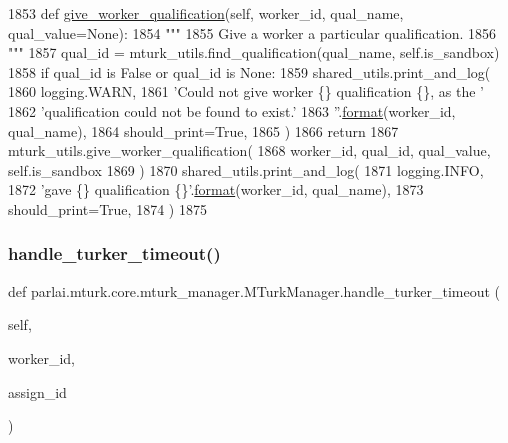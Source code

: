 \begin{DoxyCode}
1853     \textcolor{keyword}{def }\hyperlink{namespaceparlai_1_1mturk_1_1core_1_1dev_1_1mturk__utils_a631fbce36ff4d09422f29513460bc744}{give\_worker\_qualification}(self, worker\_id, qual\_name, qual\_value=None):
1854         \textcolor{stringliteral}{"""}
1855 \textcolor{stringliteral}{        Give a worker a particular qualification.}
1856 \textcolor{stringliteral}{        """}
1857         qual\_id = mturk\_utils.find\_qualification(qual\_name, self.is\_sandbox)
1858         \textcolor{keywordflow}{if} qual\_id \textcolor{keywordflow}{is} \textcolor{keyword}{False} \textcolor{keywordflow}{or} qual\_id \textcolor{keywordflow}{is} \textcolor{keywordtype}{None}:
1859             shared\_utils.print\_and\_log(
1860                 logging.WARN,
1861                 \textcolor{stringliteral}{'Could not give worker \{\} qualification \{\}, as the '}
1862                 \textcolor{stringliteral}{'qualification could not be found to exist.'}
1863                 \textcolor{stringliteral}{''}.\hyperlink{namespaceparlai_1_1chat__service_1_1services_1_1messenger_1_1shared__utils_a32e2e2022b824fbaf80c747160b52a76}{format}(worker\_id, qual\_name),
1864                 should\_print=\textcolor{keyword}{True},
1865             )
1866             \textcolor{keywordflow}{return}
1867         mturk\_utils.give\_worker\_qualification(
1868             worker\_id, qual\_id, qual\_value, self.is\_sandbox
1869         )
1870         shared\_utils.print\_and\_log(
1871             logging.INFO,
1872             \textcolor{stringliteral}{'gave \{\} qualification \{\}'}.\hyperlink{namespaceparlai_1_1chat__service_1_1services_1_1messenger_1_1shared__utils_a32e2e2022b824fbaf80c747160b52a76}{format}(worker\_id, qual\_name),
1873             should\_print=\textcolor{keyword}{True},
1874         )
1875 
\end{DoxyCode}
\mbox{\label{classparlai_1_1mturk_1_1core_1_1mturk__manager_1_1MTurkManager_ab93fd934d00fbf971ca299e77db152d5}} 
\subsubsection{\texorpdfstring{handle\+\_\+turker\+\_\+timeout()}{handle\_turker\_timeout()}}
{\footnotesize\ttfamily def parlai.\+mturk.\+core.\+mturk\+\_\+manager.\+M\+Turk\+Manager.\+handle\+\_\+turker\+\_\+timeout (\begin{DoxyParamCaption}\item[{}]{self,  }\item[{}]{worker\+\_\+id,  }\item[{}]{assign\+\_\+id }\end{DoxyParamCaption})}

